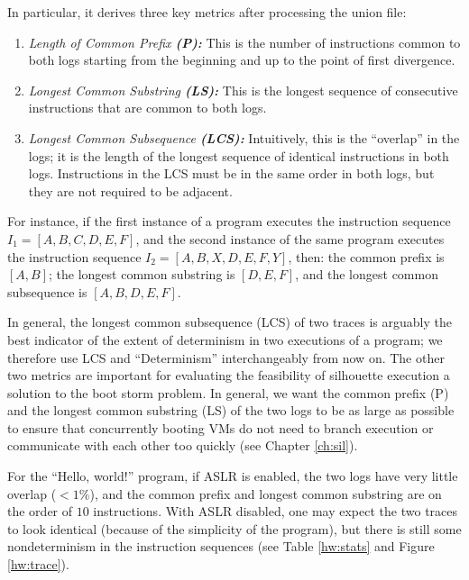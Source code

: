 In particular, it derives three key metrics
after processing the union file:
\begin{enumerate}
\item {\em Length of Common Prefix {\bf (P):}} This is 
the number of instructions common
to both logs starting from the beginning
and up to the point of first divergence.
\item {\em Longest Common Substring {\bf (LS):}}
This is the longest sequence of consecutive instructions 
that are common to both logs.
\item {\em Longest Common Subsequence {\bf (LCS):}}
Intuitively, this is the ``overlap'' in the logs;
it is the length of the longest sequence of identical instructions
in both logs. Instructions in the LCS must be in the same order
in both logs, but they are not required to be adjacent.
\end{enumerate}

\noindent For instance, if the first instance of a program
executes the instruction sequence $I_1 = [A, B, C, D, E, F]$,
and the second instance of the same program executes 
the instruction sequence $I_2 = [A, B, X, D, E, F, Y]$,
then: the common prefix is $[A, B]$; the longest
common substring is $[D, E, F]$, and the longest
common subsequence is $[A, B, D, E, F]$. 

In general, the longest common subsequence (LCS) of two traces is
arguably the best indicator of the extent of determinism
in two executions of a program; we therefore
use LCS and ``Determinism'' interchangeably from now on. 
The other two metrics are important 
for evaluating the feasibility of silhouette execution
a solution to the boot storm problem. In general,
we want the common prefix (P) and the longest common substring (LS)
of the two logs to be as large as possible to
ensure that concurrently booting VMs do not need to branch
execution or communicate with each other too quickly (see Chapter
\ref{ch:sil}).

For the ``Hello, world!'' program, if ASLR
is enabled, the two logs have very little
overlap ($< 1\%$), and the common
prefix and longest common substring
are on the order of $10$ instructions.
With ASLR disabled, one may 
expect the two traces to look identical (because
of the simplicity of the program), but
there is still some nondeterminism in the 
instruction sequences (see Table \ref{hw:stats}
and Figure \ref{hw:trace}).

